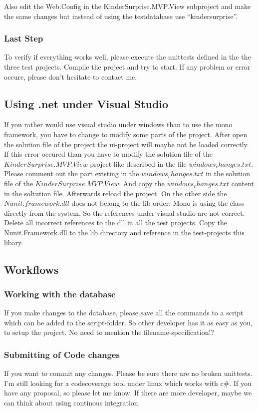 \documentclass{article}
\begin{document}
Also edit the Web.Config in the KinderSurprise.MVP.View subproject and make the
same changes but instead of using the testdatabase use ``kindersurprise''.

\subsubsection{Last Step}
To verify if everything works well, please execute the unittests defined in the
the three test projects.
Compile the project and try to start.
If any problem or error occure, please don't hesitate to contact me.

\subsection{Using .net under Visual Studio}
If you rather would use visual studio under windows than to use the mono
framework, you have to change to modify some parts of the project.
After open the solution file of the project the ui-project will maybe not be
loaded correctly. If this error occured than you have to modify the solution
file of the $KinderSurprise.MVP.View$ project like described in the file
$windows_changes.txt$.
Please comment out the part existing in the $windows_changes.txt$ in the
solution file of the $KinderSurprise.MVP.View$. And copy the
$windows_changes.txt$ content in the soltution file.
Afterwards reload the project.
\newline
On the other side the $Nunit.framework.dll$ does not belong to the lib order.
Mono is using the class directly from the system. So the references under visual
studio are not correct. Delete all incorrect references to the dll in all the
test projects. Copy the Nunit.Framework.dll to the lib directory and
reference in the test-projects this libary.

\subsection{Workflows}
\subsubsection{Working with the database}
If you make changes to the database, please save all the commands to a script
which can be added to the script-folder. So other developer has it as easy as
you, to setup the project. No need to mention the filename-specification!?
\subsubsection{Submitting of Code changes}
If you want to commit any changes. Please be sure there are no broken unittests.
I'm still looking for a codecoverage tool under linux which works with c\#. If
you have any proposal, so please let me know. If there are more developer, maybe
we can think about using continous integration.
\end{document}
